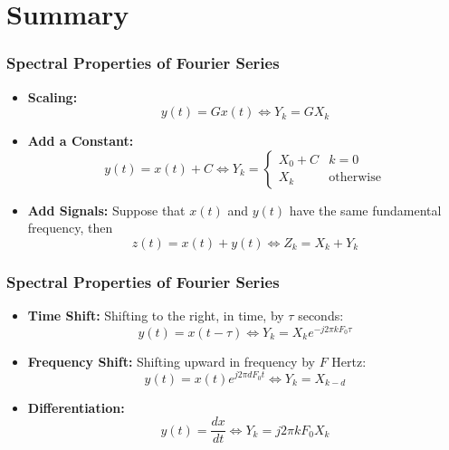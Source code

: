\documentclass{beamer}
\begin{document}
\section[Summary]{Summary}
\setcounter{subsection}{1}

\begin{frame}
  \frametitle{Spectral Properties of Fourier Series}
  \begin{itemize}
  \item {\bf Scaling:}
    \[
    y(t) = Gx(t)\Leftrightarrow Y_k = GX_k
    \]
  \item {\bf Add a Constant:}
    \[
    y(t)=x(t)+C \Leftrightarrow
    Y_k = \begin{cases}
      X_0+C & k=0 \\
      X_k & \mbox{otherwise}
    \end{cases}
    \]
  \item {\bf Add Signals:} Suppose that $x(t)$ and $y(t)$ have the
    same fundamental frequency, then
    \[
    z(t)=x(t)+y(t)
    \Leftrightarrow
    Z_k = X_k+Y_k
    \]
  \end{itemize}
\end{frame}  

\begin{frame}
  \frametitle{Spectral Properties of Fourier Series}
  \begin{itemize}
  \item {\bf Time Shift:} Shifting to the right, in time, by $\tau$
    seconds:
    \[
    y(t)=x(t-\tau)\Leftrightarrow Y_k= X_k e^{-j2\pi kF_0\tau}
    \]
  \item {\bf Frequency Shift:} Shifting upward in frequency by $F$
    Hertz:
    \[
    y(t)=x(t)e^{j2\pi dF_0t} \Leftrightarrow Y_k= X_{k-d}
    \]
  \item {\bf Differentiation:}
    \[
    y(t) = \frac{dx}{dt} \Leftrightarrow Y_k= j2\pi kF_0 X_k
    \]
  \end{itemize}
\end{frame}  
        
\end{document}
